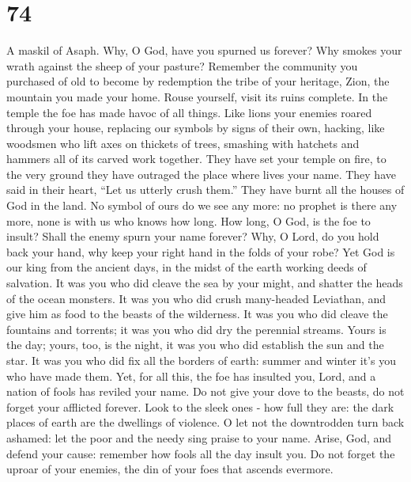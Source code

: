 \hypertarget{section-73}{%
\section{74}\label{section-73}}

A maskil of Asaph.  Why, O God, have you spurned us forever?
Why smokes your wrath against the sheep of your pasture? 
Remember the community you purchased of old to become by redemption the
tribe of your heritage, Zion, the mountain you made your home.
 Rouse yourself, visit its ruins complete. In the temple the
foe has made havoc of all things.  Like lions your enemies
roared through your house, replacing our symbols by signs of their own,
 hacking, like woodsmen who lift axes on thickets of trees,
 smashing with hatchets and hammers all of its carved work
together.  They have set your temple on fire, to the very
ground they have outraged the place where lives your name. 
They have said in their heart, ``Let us utterly crush them.'' They have
burnt all the houses of God in the land.  No symbol of ours
do we see any more: no prophet is there any more, none is with us who
knows how long.  How long, O God, is the foe to insult?
Shall the enemy spurn your name forever?  Why, O Lord, do
you hold back your hand, why keep your right hand in the folds of your
robe?  Yet God is our king from the ancient days, in the
midst of the earth working deeds of salvation.  It was you
who did cleave the sea by your might, and shatter the heads of the ocean
monsters.  It was you who did crush many-headed Leviathan,
and give him as food to the beasts of the wilderness.  It
was you who did cleave the fountains and torrents; it was you who did
dry the perennial streams.  Yours is the day; yours, too,
is the night, it was you who did establish the sun and the star.
 It was you who did fix all the borders of earth: summer
and winter it's you who have made them.  Yet, for all this,
the foe has insulted you, Lord, and a nation of fools has reviled your
name.  Do not give your dove to the beasts, do not forget
your afflicted forever.  Look to the sleek ones - how full
they are: the dark places of earth are the dwellings of violence.
 O let not the downtrodden turn back ashamed: let the poor
and the needy sing praise to your name.  Arise, God, and
defend your cause: remember how fools all the day insult you.
 Do not forget the uproar of your enemies, the din of your
foes that ascends evermore.

